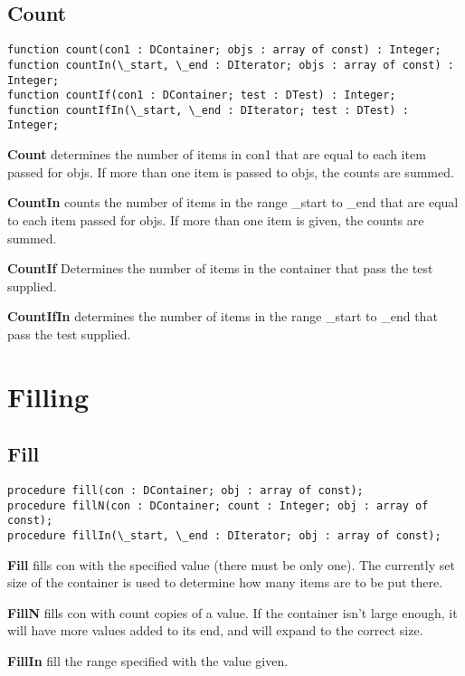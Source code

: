 \documentclass{report}
\begin{document}
\subsection{Count}

\begin{lstlisting}
function count(con1 : DContainer; objs : array of const) : Integer;
function countIn(\_start, \_end : DIterator; objs : array of const) : Integer;
function countIf(con1 : DContainer; test : DTest) : Integer;
function countIfIn(\_start, \_end : DIterator; test : DTest) : Integer;
\end{lstlisting}

\textbf{Count } determines the number of items in con1 that are equal 
to each item passed for objs. If more than one item is passed to objs, the
counts are summed.

\textbf{CountIn} counts the number of items in the range \_start to \_end 
that are equal to each item passed for objs. If more than one item is given,
the counts are summed.

\textbf{ CountIf}
 Determines the number of items in the container that 
pass the test supplied.

\textbf{ CountIfIn } determines the number of items in the range \_start to
\_end that pass the test supplied.

\section{Filling}

\subsection{Fill}
\begin{lstlisting}
procedure fill(con : DContainer; obj : array of const);
procedure fillN(con : DContainer; count : Integer; obj : array of const);
procedure fillIn(\_start, \_end : DIterator; obj : array of const);
\end{lstlisting}

\textbf{Fill} fills con with the specified value (there must be only one).
The currently set size of the container is used to determine how many items
are to be put there.

\textbf{ FillN } fills con with count copies of a value. If the container 
isn't large enough, it will have more values added to its end, and will
expand to the correct size.

\textbf{ FillIn } fill the range specified with the value given.
\end{document}
